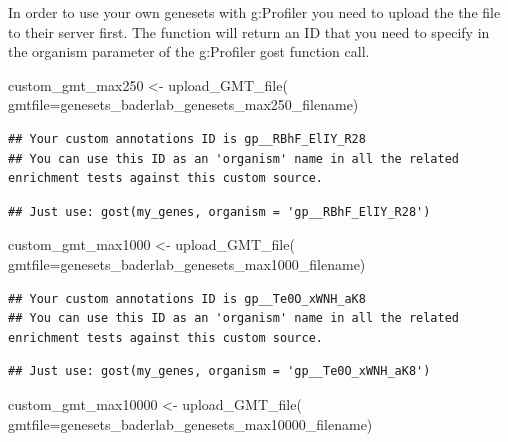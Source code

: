 \documentclass[
]{book}
\newenvironment{Shaded}{\begin{snugshade}}{\end{snugshade}}
\newcommand{\AttributeTok}[1]{\textcolor[rgb]{0.77,0.63,0.00}{#1}}
\newcommand{\FunctionTok}[1]{\textcolor[rgb]{0.00,0.00,0.00}{#1}}
\newcommand{\NormalTok}[1]{#1}
\newcommand{\OtherTok}[1]{\textcolor[rgb]{0.56,0.35,0.01}{#1}}
\begin{document}
In order to use your own genesets with g:Profiler you need to upload the the file to their server first. The function will return an ID that you need to specify in the organism parameter of the g:Profiler gost function call.

\begin{Shaded}
\begin{Highlighting}[]
\NormalTok{custom\_gmt\_max250 }\OtherTok{\textless{}{-}} \FunctionTok{upload\_GMT\_file}\NormalTok{(}
                        \AttributeTok{gmtfile=}\NormalTok{genesets\_baderlab\_genesets\_max250\_filename)}
\end{Highlighting}
\end{Shaded}

\begin{verbatim}
## Your custom annotations ID is gp__RBhF_ElIY_R28
## You can use this ID as an 'organism' name in all the related enrichment tests against this custom source.
\end{verbatim}

\begin{verbatim}
## Just use: gost(my_genes, organism = 'gp__RBhF_ElIY_R28')
\end{verbatim}

\begin{Shaded}
\begin{Highlighting}[]
\NormalTok{custom\_gmt\_max1000 }\OtherTok{\textless{}{-}} \FunctionTok{upload\_GMT\_file}\NormalTok{(}
                        \AttributeTok{gmtfile=}\NormalTok{genesets\_baderlab\_genesets\_max1000\_filename)}
\end{Highlighting}
\end{Shaded}

\begin{verbatim}
## Your custom annotations ID is gp__Te0O_xWNH_aK8
## You can use this ID as an 'organism' name in all the related enrichment tests against this custom source.
\end{verbatim}

\begin{verbatim}
## Just use: gost(my_genes, organism = 'gp__Te0O_xWNH_aK8')
\end{verbatim}

\begin{Shaded}
\begin{Highlighting}[]
\NormalTok{custom\_gmt\_max10000 }\OtherTok{\textless{}{-}} \FunctionTok{upload\_GMT\_file}\NormalTok{(}
                        \AttributeTok{gmtfile=}\NormalTok{genesets\_baderlab\_genesets\_max10000\_filename)}
\end{Highlighting}
\end{Shaded}
\end{document}
